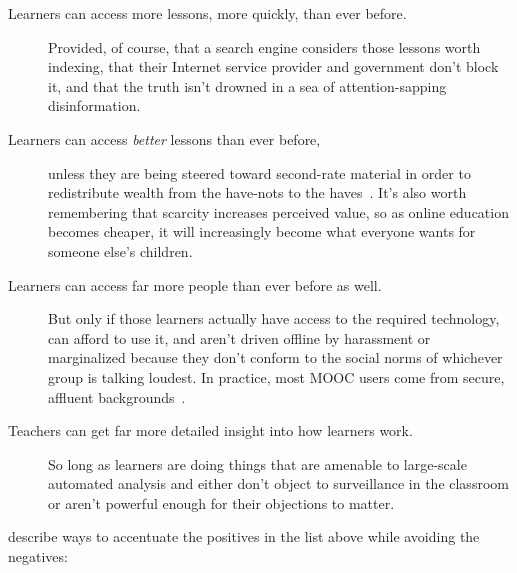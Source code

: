 \begin{description}

\item[Learners can access more lessons, more quickly, than ever before.]
  Provided,
  of course,
  that a search engine considers those lessons worth indexing,
  that their Internet service provider and government don't block it,
  and that the truth isn't drowned in a sea of attention-sapping disinformation.

\item[Learners can access \emph{better} lessons than ever before,]
  unless they are being steered toward second-rate material
  in order to redistribute wealth from the have-nots to the haves~\cite{McMi2017}.
  It's also worth remembering that scarcity increases perceived value,
  so as online education becomes cheaper,
  it will increasingly become what everyone wants for someone else's children.

\item[Learners can access far more people than ever before as well.]
  But only if those learners actually have access to the required technology,
  can afford to use it,
  and aren't driven offline by harassment or marginalized
  because they don't conform to the social norms of whichever group is talking loudest.
  In practice,
  most MOOC users come from secure, affluent backgrounds~\cite{Hans2015}.

\item[Teachers can get far more detailed insight into how learners work.]
  So long as learners are doing things that are amenable to large-scale automated analysis
  and either don't object to surveillance in the classroom
  or aren't powerful enough for their objections to matter.

\end{description}

\cite{Marg2015,Mill2016a,Nils2017} describe ways to accentuate the positives in the list above
while avoiding the negatives:

